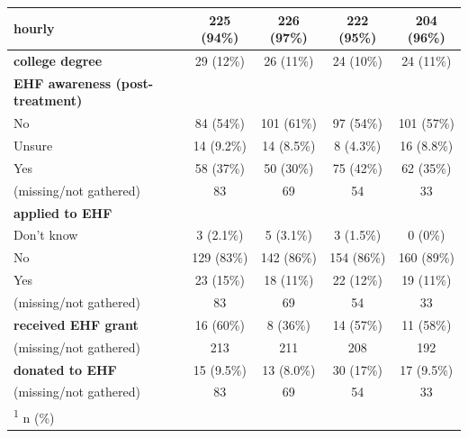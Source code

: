 \documentclass[
  11pt,
  oneside]{article}
\begin{document}
\begin{table}
\begin{tabular}[t]{l|c|c|c|c}
\hline
\textbf{hourly} & 225 (94\%) & 226 (97\%) & 222 (95\%) & 204 (96\%)\\
\hline
\textbf{college degree} & 29 (12\%) & 26 (11\%) & 24 (10\%) & 24 (11\%)\\
\hline
\textbf{EHF awareness (post-treatment)} &  &  &  & \\
\hline
\hspace{1em}No & 84 (54\%) & 101 (61\%) & 97 (54\%) & 101 (57\%)\\
\hline
\hspace{1em}Unsure & 14 (9.2\%) & 14 (8.5\%) & 8 (4.3\%) & 16 (8.8\%)\\
\hline
\hspace{1em}Yes & 58 (37\%) & 50 (30\%) & 75 (42\%) & 62 (35\%)\\
\hline
\hspace{1em}(missing/not gathered) & 83 & 69 & 54 & \vphantom{2} 33\\
\hline
\textbf{applied to EHF} &  &  &  & \\
\hline
\hspace{1em}Don't know & 3 (2.1\%) & 5 (3.1\%) & 3 (1.5\%) & 0 (0\%)\\
\hline
\hspace{1em}No & 129 (83\%) & 142 (86\%) & 154 (86\%) & 160 (89\%)\\
\hline
\hspace{1em}Yes & 23 (15\%) & 18 (11\%) & 22 (12\%) & 19 (11\%)\\
\hline
\hspace{1em}(missing/not gathered) & 83 & 69 & 54 & \vphantom{1} 33\\
\hline
\textbf{received EHF grant} & 16 (60\%) & 8 (36\%) & 14 (57\%) & 11 (58\%)\\
\hline
\hspace{1em}(missing/not gathered) & 213 & 211 & 208 & 192\\
\hline
\textbf{donated to EHF} & 15 (9.5\%) & 13 (8.0\%) & 30 (17\%) & 17 (9.5\%)\\
\hline
\hspace{1em}(missing/not gathered) & 83 & 69 & 54 & 33\\
\hline
\multicolumn{5}{l}{\rule{0pt}{1em}\textsuperscript{1} n (\%)}\\
\end{tabular}
\end{table}
\end{document}
